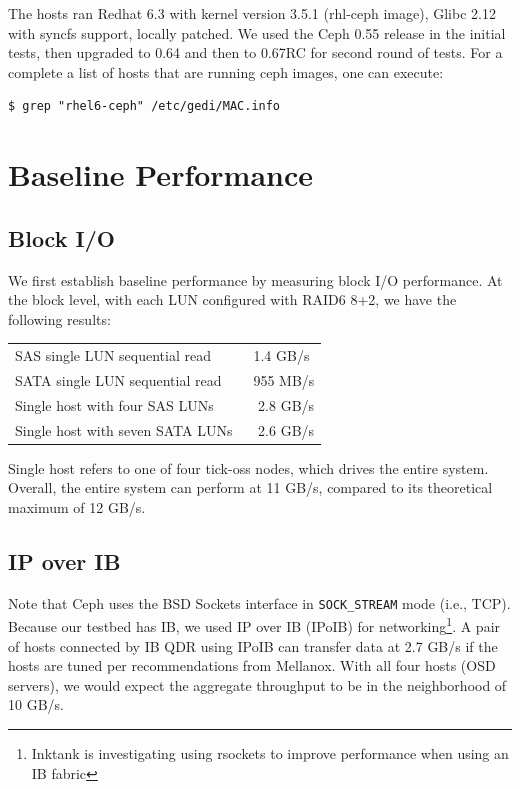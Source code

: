 \documentclass{article}
\begin{document}
The hosts ran Redhat 6.3 with kernel version 3.5.1 (rhl-ceph image), Glibc 2.12
with syncfs support, locally patched. We used the Ceph 0.55 release in the
initial tests, then upgraded to 0.64 and then to 0.67RC for second round of tests. For a
complete a list of hosts that are running ceph images, one can execute:

\begin{Verbatim}
$ grep "rhel6-ceph" /etc/gedi/MAC.info
\end{Verbatim}


\section{Baseline Performance}


\subsection*{Block I/O}
We first establish baseline performance by measuring block I/O performance.
At the block level, with each LUN configured with RAID6 8+2, we have the following
results:

\begin{table}[htb]
\centering
\begin{tabular}{ll}
    \toprule
    SAS single LUN sequential read & ~1.4 GB/s \\
    SATA single LUN sequential read & ~955 MB/s \\[0.5em]
    Single host with four SAS LUNs & ~ 2.8 GB/s \\
    Single host with seven SATA LUNs & ~ 2.6 GB/s \\
    \bottomrule
\end{tabular}

\end{table}

Single host refers to one of four tick-oss nodes, which drives the entire system.
Overall, the entire system can perform at 11 GB/s, compared to its
theoretical maximum of 12 GB/s.


\subsection*{IP over IB}

Note that Ceph uses the BSD Sockets interface in \texttt{SOCK\_STREAM} mode (i.e., TCP).
Because our testbed has IB, we used IP over IB (IPoIB) for networking\footnote{Inktank is 
investigating using rsockets to improve performance when using an IB fabric}.
A pair of hosts connected by IB QDR using IPoIB can transfer data at 2.7 GB/s if the
hosts are tuned per recommendations from Mellanox. With all four hosts (OSD servers), we would expect
the aggregate throughput to be in the neighborhood of 10 GB/s.
\end{document}
